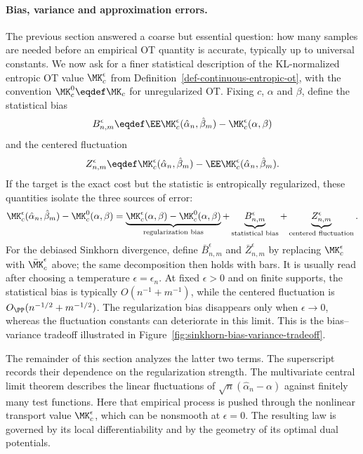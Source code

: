 \paragraph{Bias, variance and approximation errors.}
The previous section answered a coarse but essential question: how many samples are needed before an empirical OT quantity is accurate, typically up to universal constants. We now ask for a finer statistical description of the KL-normalized entropic OT value \(\MK_c^\epsilon\) from Definition~\ref{def-continuous-entropic-ot}, with the convention
\(\MK_c^0\eqdef\MK_c\) for unregularized OT\@. Fixing \(c\), \(\alpha\) and \(\beta\), define the statistical bias
\[
	B_{n,m}^\epsilon
	\eqdef
	\EE \MK_c^\epsilon(\hat\alpha_n,\hat\beta_m)
	-\MK_c^\epsilon(\alpha,\beta)
\]
and the centered fluctuation
\[
	Z_{n,m}^\epsilon
	\eqdef
	\MK_c^\epsilon(\hat\alpha_n,\hat\beta_m)
	-\EE \MK_c^\epsilon(\hat\alpha_n,\hat\beta_m).
\]
If the target is the exact cost but the statistic is entropically regularized, these quantities isolate the three sources of error:
\[
	\MK_c^\epsilon(\hat\alpha_n,\hat\beta_m)-\MK_c^0(\alpha,\beta)
	=
	\underbrace{\MK_c^\epsilon(\alpha,\beta)-\MK_c^0(\alpha,\beta)}_{\text{regularization bias}}
	+
	\underbrace{B_{n,m}^\epsilon}_{\text{statistical bias}}
	+
	\underbrace{Z_{n,m}^\epsilon}_{\text{centered fluctuation}}.
\]
For the debiased Sinkhorn divergence, define \(\bar B_{n,m}^\epsilon\) and \(\bar Z_{n,m}^\epsilon\) by replacing \(\MK_c^\epsilon\) with \(\bar\MK_c^\epsilon\) above; the same decomposition then holds with bars. It is usually read after choosing a temperature \(\epsilon=\epsilon_n\). At fixed \(\epsilon>0\) and on finite supports, the statistical bias is typically \(O(n^{-1}+m^{-1})\), while the centered fluctuation is \(O_\PP(n^{-1/2}+m^{-1/2})\). The regularization bias disappears only when \(\epsilon\to0\), whereas the fluctuation constants can deteriorate in this limit. This is the bias--variance tradeoff illustrated in Figure~\ref{fig:sinkhorn-bias-variance-tradeoff}.

The remainder of this section analyzes the latter two terms. The superscript records their dependence on the regularization strength. The multivariate central limit theorem describes the linear fluctuations of \(\sqrt n(\hat\alpha_n-\alpha)\) against finitely many test functions. Here that empirical process is pushed through the nonlinear transport value \(\MK_c^\epsilon\), which can be nonsmooth at \(\epsilon=0\). The resulting law is governed by its local differentiability and by the geometry of its optimal dual potentials.

